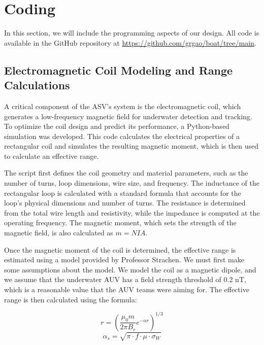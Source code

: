 \section{Coding}
\label{sec:Coding}

In this section, we will include the programming aspects of our design. All code is available in the GitHub repository at \url{https://github.com/grgao/boat/tree/main}. 

\subsection{Electromagnetic Coil Modeling and Range Calculations}
A critical component of the ASV's system is the electromagnetic coil, which generates a low-frequency magnetic field for underwater detection and tracking. To optimize the coil design and predict its performance, a Python-based simulation was developed. This code calculates the electrical properties of a rectangular coil and simulates the resulting magnetic moment, which is then used to calculate an effective range. 

The script first defines the coil geometry and material parameters, such as the number of turns, loop dimensions, wire size, and frequency. The inductance of the rectangular loop is calculated with a standard formula that accounts for  the loop's physical dimensions and number of turns. The resistance is determined from the total wire length and resistivity, while the impedance is computed at the operating frequency. The magnetic moment, which sets the strength of the magnetic field, is also calculated as $m = NIA$.

Once the magnetic moment of the coil is determined, the effective range is estimated using a model provided by Professor Strachen. We must first make some assumptions about the model. We model the coil as a magnetic dipole, and we assume that the underwater AUV has a field strength threshold of 0.2 nT, which is a reasonable value that the AUV teams were aiming for. The effective range is then calculated using the formula:

\begin{equation}
r = \left( \frac{\mu_0 m}{2 \pi B_r} e^{-\alpha r} \right)^{1/3}
\end{equation}
\begin{equation}
\alpha_s = \sqrt{\pi \cdot f \cdot \mu \cdot \sigma_W}
\end{equation}

